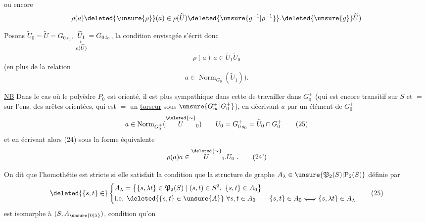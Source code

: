 ou encore
\[
\rho(a)\deleted{\unsure{\rho}}(a)\in\rho(\widetilde U)\deleted{\unsure{g^{-1}|\rho^{-1}}}.\deleted{\unsure{g}}\widetilde U\bigr)
\]

Posons $\widetilde U_0=\widetilde U=G_{0\,s_0}$, $\underset{\substack{\shortparallel\\\rho(\widetilde U)}}{\widetilde U_1}=G_{0\,t_0}$, la condition envisagée s'écrit donc
\[
\rho(a)\,a\in\widetilde U_1\widetilde U_0\tag*{(24)}
\]
(en plus de la relation
\[
a\in\operatorname{Norm}_{G_0}(\widetilde U_1)\bigr).
\]

\uline{NB} Dans le cas où le polyèdre $P_0$ est orienté, il est plus sympathique dans cette  de travailler dans $G_0^+$ (qui est encore transitif sur $S$ et $=$ sur l'ens. des arêtes orientées, qui est $=$ un \uline{torseur} sous $\unsure{G_\infty^+|G_0^+}$), en décrivant $a$ par un élément de $G_0^+$
\[
a\in\operatorname{Norm}_{G_0^+}(\overset{\deleted{\sim}}{U}_0)\qquad U_0=G^+_{0\,s_0}=\widetilde U_0\cap G_0^+ \tag*{(25)}
\]
et en écrivant  alors (24)  sous la forme équivalente
\[
\rho(a)a\in\overset{\deleted{\sim}}{U}_1.U_0\ .\tag*{(24')}
\]

On dit que l'homothétie \inserted{$\lambda$} est stricte si elle satisfait la condition que la structure de graphe  $A_\lambda\in\unsure{\mathfrak P_2(S)|\mathrm P_2(S)}$ définie par
\[
\deleted{\{s,t\}\in}\left\{\begin{aligned}
&A_\lambda=\bigl\{\{s,\lambda t\}\in\mathfrak P_2(S)\mid(s,t)\in S^2,\ \{s,t\}\in A_0\bigr\}\\
&\text{i.e. }\deleted{\{s,t\}\in\unsure{A}}\ \forall s,t\in A_0\qquad
\{s,t\}\in A_0\Longleftrightarrow\{s,\lambda t\}\in A_\lambda
\end{aligned}\right.\tag*{(25)}
\]
est isomorphe à $(S,A_{\unsure{0|\lambda}})$,  condition qu'on

